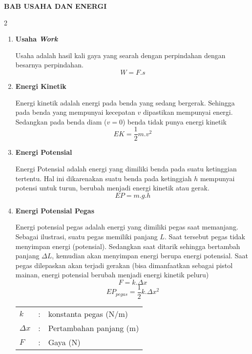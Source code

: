 \documentclass[10pt,a4paper]{article}
\begin{document}
\begin{center} \textbf{BAB USAHA DAN ENERGI}\end{center}



\begin{multicols*} {2} 
\newcommand{\tikzmark}[2]{\tikz[remember picture,baseline=(#1.base)]{\node[inner sep=0pt] (#1) {#2};}} 


\begin{enumerate}[label=\textbf{\Alph*.},itemsep=0mm]

\item \textbf{Usaha \textit{Work}}

    Usaha adalah hasil kali gaya yang searah dengan perpindahan dengan besarnya perpindahan.
    $$ W = F.s $$

\item \textbf{Energi Kinetik}

    Energi kinetik adalah energi pada benda yang sedang bergerak. Sehingga pada benda yang mempunyai kecepatan $v$ dipastikan mempunyai energi. Sedangkan pada benda diam ($v = 0$) benda tidak punya energi kinetik
    $$ EK = \frac{1}{2} m.v^2$$

\item \textbf{Energi Potensial}

    Energi Potensial adalah energi yang dimiliki benda pada suatu ketinggian tertentu. Hal ini dikarenakan suatu benda pada ketinggiah $h$ mempunyai potensi untuk turun, berubah menjadi energi kinetik atau gerak.
    $$ EP = m.g.h $$ 


\item \textbf{Energi Potensial Pegas}

    Energi potensial pegas adalah energi yang dimiliki pegas saat memanjang. Sebagai ilustrasi, suatu pegas memiliki panjang $L$. Saat tersebut pegas tidak menyimpan energi (potensial). Sedangkan saat ditarik sehingga bertambah panjang $\Delta L$, kemudian akan menyimpan energi berupa energi potensial. Saat pegas dilepaskan akan terjadi gerakan (bisa dimanfaatkan sebagai pistol mainan, energi potensial berubah menjadi energi kinetik peluru)
    $$ F = k.\Delta x$$
    $$ EP_{pegas}=\frac{1}{2}k.\Delta x^2$$
    \begin{tabular}{p{0.2cm} p{0.1cm} l}
    $k$ & : & konstanta pegas (N/m) \\
    $\Delta x $  &: & Pertambahan panjang (m) \\
    $F $ &:& Gaya (N)\\
    \end{tabular}


\end{enumerate}
\end{multicols*}
\end{document}

